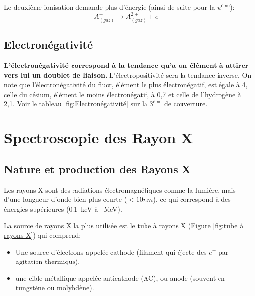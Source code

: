 \documentclass{article}
\begin{document}
Le deuxième ionisation demande plus d'énergie (ainsi de suite pour la $n^{\text{ème}}$): 
$$A^{+}_{(gaz)} \rightarrow A^{2+}_{(gaz)} + e^-$$

\vspace{1mm}
\hspace{0cm}\pgfPT[
    Z list=spd,
    CS all=darkgray,    
    csSoft,
    cell size=22pt, 
    show title=false, 
    show legend,
    show legend pins=false,
    name font=\Tiny,
    show periodic variations,
    cell style=pgfPTEi,
    varEi font=\footnotesize,    
    varR font=\footnotesize,
    varEi color=purple!50!white,
    Ei color=purple
    ]


\subsection{Electronégativité} \label{sous-section:Electronégativité}

\textbf{L'électronégativité correspond à la tendance qu'a un élément à attirer vers lui un doublet de liaison.} L'électropositivité sera la tendance inverse.
On note que l'électronégativité du fluor, élément le plus électronégatif, est égale à 4, celle 
du césium, élément le moins électronégatif, à 0,7 et celle de l'hydrogène à 2,1.
Voir le tableau \ref{fig:Electronégativité} sur la $3^{\text{ème}}$ de couverture.



\section{Spectroscopie des Rayon X}

\subsection{Nature et production des Rayons X}

Les rayons X sont des radiations électromagnétiques comme la lumière, mais d'une 
longueur d'onde bien plus courte ($<10 nm$), ce qui correspond à des 
énergies supérieures (\qty{0.1}{keV} à \qty{}{MeV}).

La source de rayons X la plus utilisée est le tube à rayons X (Figure \ref{fig:tube à rayons X}) qui comprend:

\begin{itemize}[label=$\ast$]
    \item Une source d'électrons appelée cathode (filament qui éjecte des $e^-$ par agitation thermique).
    \item une cible métallique appelée anticathode (AC), ou anode (souvent en tungstène ou molybdène).
\end{itemize}
\end{document}
